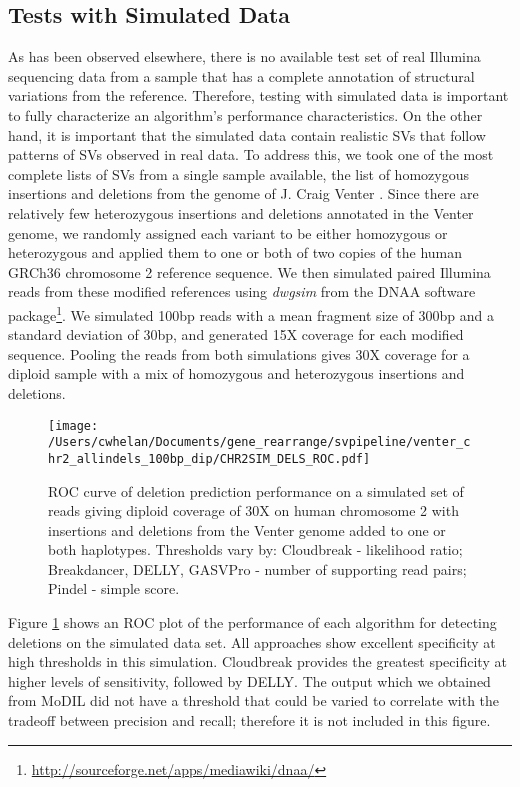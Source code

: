 \documentclass[11pt]{article}
\begin{document}
\subsection{Tests with Simulated Data}

As has been observed elsewhere, there is no available test set of real Illumina sequencing data from a sample that has a complete annotation of structural variations from the reference. Therefore, testing with simulated data is important to fully characterize an algorithm's performance characteristics. On the other hand, it is important that the simulated data contain realistic SVs that follow patterns of SVs observed in real data. To address this, we took one of the most complete lists of SVs from a single sample available, the list of homozygous insertions and deletions from the genome of J. Craig Venter \autocite{Levy:2007fb}. Since there are relatively few heterozygous insertions and deletions annotated in the Venter genome, we randomly assigned each variant to be either homozygous or heterozygous and applied them to one or both of two copies of the human GRCh36 chromosome 2 reference sequence. We then simulated paired Illumina reads from these modified references using \emph{dwgsim} from the DNAA software package\footnote{\url{http://sourceforge.net/apps/mediawiki/dnaa/}}. We simulated 100bp reads with a mean fragment size of 300bp and a standard deviation of 30bp, and generated 15X coverage for each modified sequence. Pooling the reads from both simulations gives 30X coverage for a diploid sample with a mix of homozygous and heterozygous insertions and deletions.

\begin{figure}[b]
\centering
\texttt{[image: /Users/cwhelan/Documents/gene\_rearrange/svpipeline/venter\_chr2\_allindels\_100bp\_dip/CHR2SIM\_DELS\_ROC.pdf]}
\caption{ROC curve of deletion prediction performance on a simulated set of reads giving diploid coverage of 30X on human chromosome 2 with insertions and deletions from the Venter genome added to one or both haplotypes. Thresholds vary by: Cloudbreak - likelihood ratio; Breakdancer, DELLY, GASVPro - number of supporting read pairs; Pindel - simple score.}
\label{chr2DeletionsRoc}
\end{figure}

Figure \ref{chr2DeletionsRoc} shows an ROC plot of the performance of each algorithm for detecting deletions on the simulated data set. All approaches show excellent specificity at high thresholds in this simulation. Cloudbreak provides the greatest specificity at higher levels of sensitivity, followed by DELLY. The output which we obtained from MoDIL did not have a threshold that could be varied to correlate with the tradeoff between precision and recall; therefore it is not included in this figure.
\end{document}

